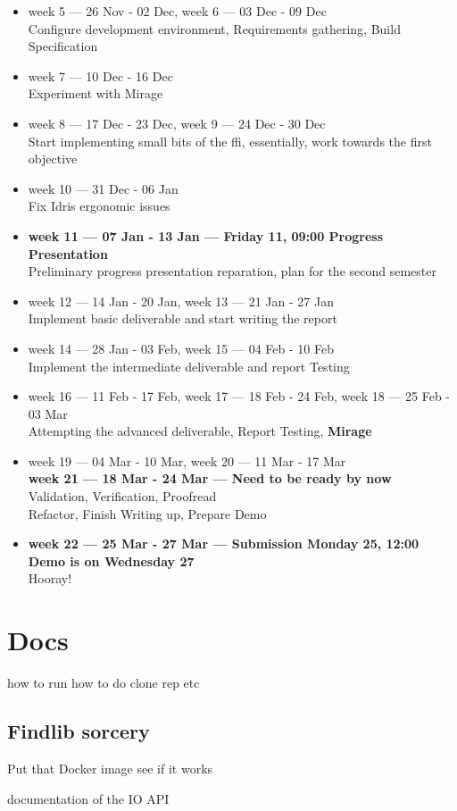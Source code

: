 \begin{itemize}
    \item week 5 --- 26 Nov - 02 Dec,
          week 6 --- 03 Dec - 09 Dec \\
          Configure development environment,
          Requirements gathering,
          Build Specification
    \item week 7 --- 10 Dec - 16 Dec \\
          Experiment with Mirage
    \item week 8 --- 17 Dec - 23 Dec,
          week 9 --- 24 Dec - 30 Dec \\
          Start implementing small bits
          of the ffi, essentially,
          work towards the first objective
    \item week 10 --- 31 Dec - 06 Jan \\ Fix Idris ergonomic issues
    \item \textbf{week 11 --- 07 Jan - 13 Jan ---
              Friday 11, 09:00
              Progress Presentation} \\ Preliminary progress presentation
          reparation, plan for the second semester
    \item week 12 --- 14 Jan - 20 Jan,
          week 13 --- 21 Jan - 27 Jan \\
          Implement basic deliverable
          and start writing
          the report
    \item week 14 --- 28 Jan - 03 Feb,
          week 15 --- 04 Feb - 10 Feb \\ Implement the intermediate
          deliverable and report Testing
    \item week 16 --- 11 Feb - 17 Feb,
          week 17 --- 18 Feb - 24 Feb,
          week 18 --- 25 Feb - 03 Mar \\ Attempting the advanced
          deliverable, Report Testing, \textbf{Mirage}
    \item week 19 --- 04 Mar - 10 Mar,
          week 20 --- 11 Mar - 17 Mar \\
          \textbf{week 21 --- 18 Mar - 24 Mar ---
              Need to be ready by now} \\
          Validation,
          Verification,
          Proofread \\
          Refactor,
          Finish Writing up,
          Prepare Demo
    \item \textbf{week 22 --- 25 Mar - 27 Mar ---
              Submission Monday 25, 12:00
              Demo is on Wednesday 27} \\ Hooray!

\end{itemize}

\section{Docs}

how to run how to do clone rep etc

\subsection{Findlib sorcery}

Put that Docker image see if it works

documentation of the IO API